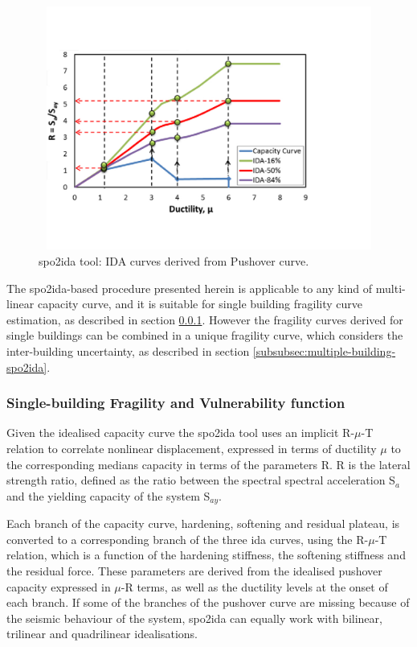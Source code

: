 \begin{figure}[H]
\centering
\includegraphics[width=12cm,height=8cm]{./figures/spo2ida.jpg}
\caption{spo2ida tool: IDA curves derived from Pushover curve.}
\label{fig:spo2ida}
\end{figure}

The spo2ida-based procedure presented herein is applicable to any kind of multi-linear capacity curve, and it is suitable for single building fragility curve estimation, as described in section \ref{subsubsec:single-building-spo2ida}. However the fragility curves derived for single buildings can be combined in a unique fragility curve, which considers the inter-building uncertainty, as described in section \ref{subsubsec:multiple-building-spo2ida}.

\subsubsection{Single-building Fragility and Vulnerability function}
\label{subsubsec:single-building-spo2ida}
Given the idealised capacity curve the spo2ida tool uses an implicit R-$\mu$-T relation to correlate nonlinear displacement, expressed in terms of ductility $\mu$ to the corresponding medians capacity in terms of the parameters R. R is the lateral strength ratio, defined as the ratio between the spectral spectral acceleration S$_a$ and the yielding capacity of the system S$_{ay}$. 

Each branch of the capacity curve, hardening, softening and residual plateau, is converted to a corresponding branch of the three ida curves, using the R-$\mu$-T relation, which is a function of the hardening stiffness, the softening stiffness and the residual force. These parameters are derived from the idealised pushover capacity expressed in $\mu$-R terms, as well as the ductility levels at the onset of each branch. If some of the branches of the pushover curve are missing because of the seismic behaviour of the system, spo2ida can equally work with bilinear, trilinear and quadrilinear idealisations.

